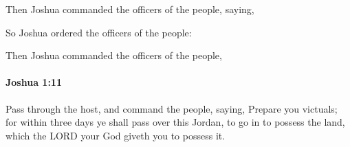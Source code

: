 			\begin{versebox}
					\item[BHS] 
					\item[ASV] Then Joshua commanded the officers of the people, saying,
					\item[NIV] So Joshua ordered the officers of the people:
					\item[NRSV] Then Joshua commanded the officers of the people,
			\end{versebox}

		\paragraph{Joshua 1:11} %
			\label{JOSHUA-1-11}

			Pass through the host, and command the people, saying, Prepare you victuals; for within three days ye shall pass over this Jordan, to go in to possess the land, which the LORD your God giveth you to possess it.

